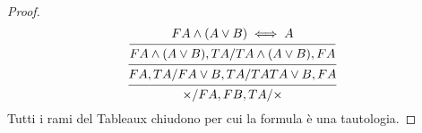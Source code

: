 \begin{proof}
\begin{equation*}
\begin{prooftree}
\hypo{F A \land (A \lor B) \iff A}
\infer1 {F A \land (A \lor B),TA/T A \land(A \lor B),FA}
\infer1 {FA,TA/F A \lor B,TA/TA T A \lor B,FA}
\infer1{\times/FA,FB,TA/\times}
\end{prooftree}
\end{equation*}
Tutti i rami del Tableaux chiudono per cui la formula è una tautologia.
\end{proof}
